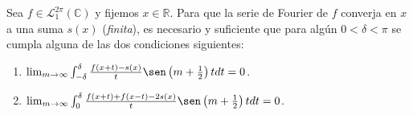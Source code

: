 \documentclass[12pt]{report}
\newcounter{it}
\theoremstyle{largebreak}
\begin{document}
    \begin{theor}
        Sea $f\in\mathcal{L}_1^{2\pi}(\mathbb{C})$ y fijemos $x\in\mathbb{R}$. Para que la serie de Fourier de $f$ converja en $x$ a una suma $s(x)$ (\textit{finita}), es necesario y suficiente que para algún $0<\delta<\pi$ se cumpla alguna de las dos condiciones siguientes:
        \begin{enumerate}
            \item $\lim_{ m\rightarrow\infty}\int_{-\delta}^\delta \frac{f(x+t)-s(x)}{t}\sen\left(m+\frac{1}{2} \right)tdt=0$.
            \item $\lim_{ m\rightarrow\infty}\int_{0}^\delta \frac{f(x+t)+f(x-t)-2s(x)}{t}\sen\left(m+\frac{1}{2} \right)tdt=0$.
        \end{enumerate}
    \end{theor}
\end{document}
